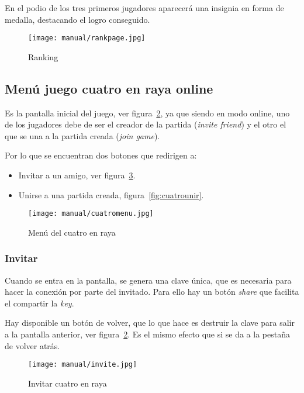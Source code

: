 En el podio de los tres primeros jugadores aparecerá una insignia en forma de medalla, destacando el logro conseguido.

\begin{figure}[H]
	\centering
	\texttt{[image: manual/rankpage.jpg]}
	\caption{Ranking}\label{fig:rankpage}
\end{figure}

\subsection{Menú juego cuatro en raya online}\label{cuatromenu}
Es la pantalla inicial del juego, ver figura~\ref{fig:cuatromenu}, ya que siendo en modo online, uno de los jugadores debe de ser el creador de la  partida (\emph{invite friend}) y el otro el que se una a la partida creada (\emph{join game}).

Por lo que se encuentran dos botones que redirigen a:
\begin{itemize}
	\item Invitar a un amigo, ver figura~\ref{fig:cuatroinvitar}.
	\item Unirse a una partida creada, figura~\ref{fig:cuatrounir}.
\end{itemize}

\begin{figure}[H]
	\centering
	\texttt{[image: manual/cuatromenu.jpg]}
	\caption{Menú del cuatro en raya}\label{fig:cuatromenu}
\end{figure}

\subsubsection{Invitar}\label{cuatroinvitar}
Cuando se entra en la pantalla, se genera una clave única, que es necesaria para hacer la conexión por parte del invitado. Para ello hay un botón \emph{share} que facilita el compartir la \emph{key}.

Hay disponible un botón de volver, que lo que hace es destruir la clave para salir a la pantalla anterior, ver figura~\ref{fig:cuatromenu}. Es el mismo efecto que si se da a la pestaña de volver atrás.


\begin{figure}[H]
	\centering
	\texttt{[image: manual/invite.jpg]}
	\caption{Invitar cuatro en raya}\label{fig:cuatroinvitar}
\end{figure}


